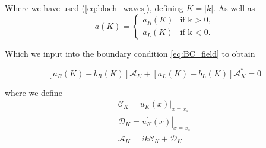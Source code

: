Where we have used (\ref{eq:bloch_waves}), defining $K = |k|$. As well as 
\begin{equation}
    a(K) = 
    \begin{cases}
    a_R(K) &\text{if k > 0,}\\
    a_L(K) &\text{if k < 0.}
    \end{cases}
\end{equation}




Which we input into the  boundary condition \ref{eq:BC_field} to obtain

\begin{equation}
    \left[a_R(K) - b_R(K)\right]\mathcal{A}_K + \left[a_L(K) - b_L(K)\right]\mathcal{A}_K^* = 0 
\end{equation}

where we define
\begin{gather}
    \mathcal{C}_K = \left.u_K(x)\right|_{x=x_s}\\
    \mathcal{D}_K = \left.u_K^{\prime}(x)\right|_{x=x_s}\\
    \mathcal{A}_K = ik\mathcal{C}_K + \mathcal{D}_K
\end{gather}

